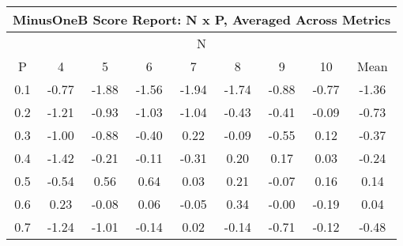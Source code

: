 \begin{longtable}{ | c || c | c | c | c | c | c | c || c |}
\hline
\multicolumn{9}{|c|}{ MinusOneB Score Report: N x P, Averaged Across Metrics } \\
\hline
\multicolumn{9}{|c|}{ N } \\
\hline
P & 4 & 5 & 6 & 7 & 8 & 9 & 10 & Mean\\
\hline
\hline
\endhead
0.1 &  \cellcolor[HTML]{FFEFEF} -0.77 &  \cellcolor[HTML]{FFCFCF} -1.88 &  \cellcolor[HTML]{FFD7D7} -1.56 &  \cellcolor[HTML]{FFCFCF} -1.94 &  \cellcolor[HTML]{FFD7D7} -1.74 &  \cellcolor[HTML]{FFE7E7} -0.88 &  \cellcolor[HTML]{FFEFEF} -0.77 &  \cellcolor[HTML]{FFDFDF} -1.36 \\
0.2 &  \cellcolor[HTML]{FFDFDF} -1.21 &  \cellcolor[HTML]{FFE7E7} -0.93 &  \cellcolor[HTML]{FFE7E7} -1.03 &  \cellcolor[HTML]{FFE7E7} -1.04 &  \cellcolor[HTML]{FFF7F7} -0.43 &  \cellcolor[HTML]{FFF7F7} -0.41 &  \cellcolor[HTML]{FFFFFF} -0.09 &  \cellcolor[HTML]{FFEFEF} -0.73 \\
0.3 &  \cellcolor[HTML]{FFE7E7} -1.00 &  \cellcolor[HTML]{FFE7E7} -0.88 &  \cellcolor[HTML]{FFF7F7} -0.40 &  \cellcolor[HTML]{F7F7FF} 0.22 &  \cellcolor[HTML]{FFFFFF} -0.09 &  \cellcolor[HTML]{FFEFEF} -0.55 &  \cellcolor[HTML]{FFFFFF} 0.12 &  \cellcolor[HTML]{FFF7F7} -0.37 \\
0.4 &  \cellcolor[HTML]{FFDFDF} -1.42 &  \cellcolor[HTML]{FFF7F7} -0.21 &  \cellcolor[HTML]{FFFFFF} -0.11 &  \cellcolor[HTML]{FFF7F7} -0.31 &  \cellcolor[HTML]{F7F7FF} 0.20 &  \cellcolor[HTML]{F7F7FF} 0.17 &  \cellcolor[HTML]{FFFFFF} 0.03 &  \cellcolor[HTML]{FFF7F7} -0.24 \\
0.5 &  \cellcolor[HTML]{FFEFEF} -0.54 &  \cellcolor[HTML]{EFEFFF} 0.56 &  \cellcolor[HTML]{EFEFFF} 0.64 &  \cellcolor[HTML]{FFFFFF} 0.03 &  \cellcolor[HTML]{F7F7FF} 0.21 &  \cellcolor[HTML]{FFFFFF} -0.07 &  \cellcolor[HTML]{F7F7FF} 0.16 &  \cellcolor[HTML]{FFFFFF} 0.14 \\
0.6 &  \cellcolor[HTML]{F7F7FF} 0.23 &  \cellcolor[HTML]{FFFFFF} -0.08 &  \cellcolor[HTML]{FFFFFF} 0.06 &  \cellcolor[HTML]{FFFFFF} -0.05 &  \cellcolor[HTML]{F7F7FF} 0.34 &  \cellcolor[HTML]{FFFFFF} -0.00 &  \cellcolor[HTML]{FFF7F7} -0.19 &  \cellcolor[HTML]{FFFFFF} 0.04 \\
0.7 &  \cellcolor[HTML]{FFDFDF} -1.24 &  \cellcolor[HTML]{FFE7E7} -1.01 &  \cellcolor[HTML]{FFFFFF} -0.14 &  \cellcolor[HTML]{FFFFFF} 0.02 &  \cellcolor[HTML]{FFFFFF} -0.14 &  \cellcolor[HTML]{FFEFEF} -0.71 &  \cellcolor[HTML]{FFFFFF} -0.12 &  \cellcolor[HTML]{FFEFEF} -0.48 \\

\end{longtable}
